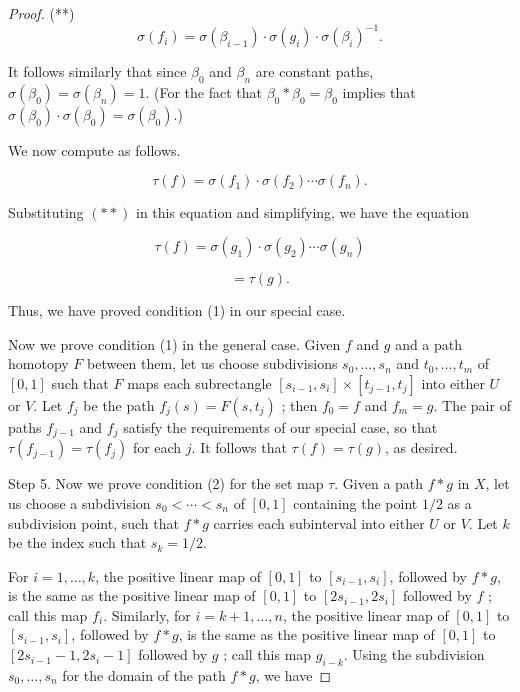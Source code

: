 \begin{proof}
(**)
\[
\sigma ( f_{i}) = \sigma ( {\beta }_{i - 1}) \cdot \sigma ( g_{i}) \cdot \sigma {( {\beta }_{i}) }^{-1}.
\]

It follows similarly that since \({\beta }_{0}\) and \({\beta }_{n}\) are constant paths, \(\sigma ( {\beta }_{0}) = \sigma ( {\beta }_{n}) = 1\). (For the fact that \({\beta }_{0} * {\beta }_{0} = {\beta }_{0}\) implies that \(\sigma ( {\beta }_{0}) \cdot \sigma ( {\beta }_{0}) = \sigma ( {\beta }_{0})\).)

We now compute as follows.

\[
\tau ( f) = \sigma ( f_{1}) \cdot \sigma ( f_{2}) \cdots \sigma ( f_{n}).
\]

Substituting \(( {* * })\) in this equation and simplifying, we have the equation

\[
\tau ( f) = \sigma ( g_{1}) \cdot \sigma ( g_{2}) \cdots \sigma ( g_{n})
\]

\[
= \tau ( g) \text{.}
\]

Thus, we have proved condition (1) in our special case.

Now we prove condition (1) in the general case. Given \(f\) and \(g\) and a path homotopy \(F\) between them, let us choose subdivisions \(s_{0},\ldots ,s_{n}\) and \(t_{0},\ldots ,t_{m}\) of \([ {0,1}]\) such that \(F\) maps each subrectangle \([ {s_{i - 1},s_{i}}] \times [ {t_{j - 1},t_{j}}]\) into either \(U\) or \(V\). Let \(f_{j}\) be the path \(f_{j}( s) = F( {s,t_{j}})\) ; then \(f_{0} = f\) and \(f_{m} = g\). The pair of paths \(f_{j - 1}\) and \(f_{j}\) satisfy the requirements of our special case, so that \(\tau ( f_{j - 1}) = \tau ( f_{j})\) for each \(j\). It follows that \(\tau ( f) = \tau ( g)\), as desired.

Step 5. Now we prove condition (2) for the set map \(\tau\). Given a path \(f * g\) in \(X\), let us choose a subdivision \(s_{0} < \cdots < s_{n}\) of \([ {0,1}]\) containing the point \(1/2\) as a subdivision point, such that \(f * g\) carries each subinterval into either \(U\) or \(V\). Let \(k\) be the index such that \(s_{k} = 1/2\).

For \(i = 1,\ldots, k\), the positive linear map of \([ {0,1}]\) to \([ {s_{i - 1},s_{i}}]\), followed by \(f * g\), is the same as the positive linear map of \([ {0,1}]\) to \([ {2s_{i - 1},2s_{i}}]\) followed by \(f\) ; call this map \(f_{i}\). Similarly, for \(i = k + 1,\ldots, n\), the positive linear map of \([ {0,1}]\) to \([ {s_{i - 1},s_{i}}]\), followed by \(f * g\), is the same as the positive linear map of \([ {0,1}]\) to \([ {2s_{i - 1} - 1,2s_{i} - 1}]\) followed by \(g\) ; call this map \(g_{i - k}\). Using the subdivision \(s_{0},\ldots ,s_{n}\) for the domain of the path \(f * g\), we have


\end{proof}
